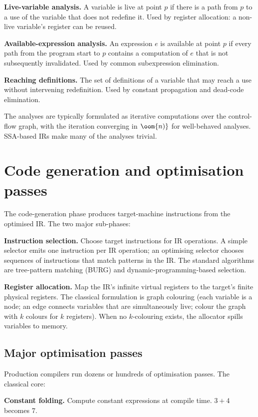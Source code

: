\textbf{Live-variable analysis.} A variable is live at point $p$ if there is a path from $p$ to a use of the variable that does not redefine it. Used by register allocation: a non-live variable's register can be reused.

\textbf{Available-expression analysis.} An expression $e$ is available at point $p$ if every path from the program start to $p$ contains a computation of $e$ that is not subsequently invalidated. Used by common subexpression elimination.

\textbf{Reaching definitions.} The set of definitions of a variable that may reach a use without intervening redefinition. Used by constant propagation and dead-code elimination.

The analyses are typically formulated as iterative computations over the control-flow graph, with the iteration converging in $\oom{n)}$ for well-behaved analyses. SSA-based IRs make many of the analyses trivial.

\section{Code generation and optimisation passes}

The code-generation phase produces target-machine instructions from the optimised IR. The two major sub-phases:

\textbf{Instruction selection.} Choose target instructions for IR operations. A simple selector emits one instruction per IR operation; an optimising selector chooses sequences of instructions that match patterns in the IR. The standard algorithms are tree-pattern matching (BURG) and dynamic-programming-based selection.

\textbf{Register allocation.} Map the IR's infinite virtual registers to the target's finite physical registers. The classical formulation is graph colouring (each variable is a node; an edge connects variables that are simultaneously live; colour the graph with $k$ colours for $k$ registers). When no $k$-colouring exists, the allocator spills variables to memory.

\subsection{Major optimisation passes}

Production compilers run dozens or hundreds of optimisation passes. The classical core:

\textbf{Constant folding.} Compute constant expressions at compile time. $3 + 4$ becomes $7$.


